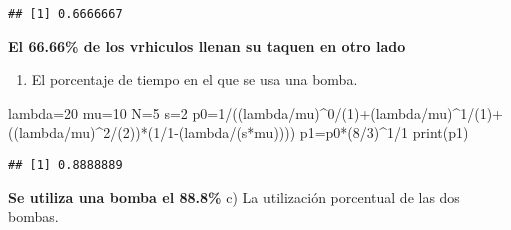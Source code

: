 \documentclass[
]{article}
\newenvironment{Shaded}{\begin{snugshade}}{\end{snugshade}}
\newcommand{\DecValTok}[1]{\textcolor[rgb]{0.00,0.00,0.81}{#1}}
\newcommand{\FunctionTok}[1]{\textcolor[rgb]{0.00,0.00,0.00}{#1}}
\newcommand{\NormalTok}[1]{#1}
\newcommand{\OtherTok}[1]{\textcolor[rgb]{0.56,0.35,0.01}{#1}}
\newcommand{\SpecialCharTok}[1]{\textcolor[rgb]{0.00,0.00,0.00}{#1}}
\providecommand{\tightlist}{%
  \setlength{\itemsep}{0pt}\setlength{\parskip}{0pt}}
\begin{document}
\begin{verbatim}
## [1] 0.6666667
\end{verbatim}

\textbf{El 66.66\% de los vrhiculos llenan su taquen en otro lado}

\begin{enumerate}
\def\labelenumi{\alph{enumi})}
\setcounter{enumi}{1}
\tightlist
\item
  El porcentaje de tiempo en el que se usa una bomba.
\end{enumerate}

\begin{Shaded}
\begin{Highlighting}[]
\NormalTok{lambda}\OtherTok{=}\DecValTok{20}
\NormalTok{mu}\OtherTok{=}\DecValTok{10}
\NormalTok{N}\OtherTok{=}\DecValTok{5}
\NormalTok{s}\OtherTok{=}\DecValTok{2}
\NormalTok{p0}\OtherTok{=}\DecValTok{1}\SpecialCharTok{/}\NormalTok{((lambda}\SpecialCharTok{/}\NormalTok{mu)}\SpecialCharTok{\^{}}\DecValTok{0}\SpecialCharTok{/}\NormalTok{(}\DecValTok{1}\NormalTok{)}\SpecialCharTok{+}\NormalTok{(lambda}\SpecialCharTok{/}\NormalTok{mu)}\SpecialCharTok{\^{}}\DecValTok{1}\SpecialCharTok{/}\NormalTok{(}\DecValTok{1}\NormalTok{)}\SpecialCharTok{+}\NormalTok{((lambda}\SpecialCharTok{/}\NormalTok{mu)}\SpecialCharTok{\^{}}\DecValTok{2}\SpecialCharTok{/}\NormalTok{(}\DecValTok{2}\NormalTok{))}\SpecialCharTok{*}\NormalTok{(}\DecValTok{1}\SpecialCharTok{/}\DecValTok{1}\SpecialCharTok{{-}}\NormalTok{(lambda}\SpecialCharTok{/}\NormalTok{(s}\SpecialCharTok{*}\NormalTok{mu))))}
\NormalTok{p1}\OtherTok{=}\NormalTok{p0}\SpecialCharTok{*}\NormalTok{(}\DecValTok{8}\SpecialCharTok{/}\DecValTok{3}\NormalTok{)}\SpecialCharTok{\^{}}\DecValTok{1}\SpecialCharTok{/}\DecValTok{1}
\FunctionTok{print}\NormalTok{(p1)}
\end{Highlighting}
\end{Shaded}

\begin{verbatim}
## [1] 0.8888889
\end{verbatim}

\textbf{Se utiliza una bomba el 88.8\%} c) La utilización porcentual de
las dos bombas.
\end{document}
